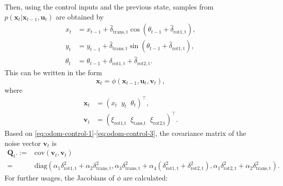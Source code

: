 Then, using the control inputs and the previous state, samples from $p(\mathbf{x}_t | \mathbf{x}_{t-1},\mathbf{u}_t)$
are obtained by
\begin{align}
    x_t      & = x_{t-1} + \hat{\delta}_{\mathrm{trans,t}}\cos(\theta_{t-1} + \hat{\delta}_{\mathrm{rot1,t}}), \label{eq:prop-x} \\
    y_t      & = y_{t-1} + \hat{\delta}_{\mathrm{trans,t}}\sin(\theta_{t-1} + \hat{\delta}_{\mathrm{rot1,t}}), \label{eq:prop-y} \\
    \theta_t & = \theta_{t-1} + \hat{\delta}_{\mathrm{rot1,t}} + \hat{\delta}_{\mathrm{rot2,t}}. \label{eq:prop-theta}
\end{align}
This can be written in the form
\begin{equation}
    \mathbf{x}_t = \phi(\mathbf{x}_{t-1},\mathbf{u}_t,\mathbf{v}_t),
\end{equation}
where
\begin{align}
    \mathbf{x}_t & = (x_t\;\;y_t\;\;\theta_t)^{\top},                                            \\
    \mathbf{v}_t & = (\xi_{\text{rot1,t}}\;\;\xi_{\text{tans,t}}\;\;\xi_{\text{rot2,t}})^{\top}.
\end{align}
Based on \eqref{eq:odom-control-1}-\eqref{eq:odom-control-3}, the covariance matrix of the noise
vector $\mathbf{v}_t$ is
\begin{align}\label{eq:control-covar}
    \mathbf{Q}_t. := & \text{cov}(\mathbf{v}_t,\mathbf{v}_t) \nonumber \\
    =                &
    \text{diag}(\alpha_1\delta_{\mathrm{rot1,t}}^2+\alpha_2\delta_{\mathrm{trans,t}}^2,
    \alpha_3\delta_{\mathrm{trans,t}}^2+\alpha_4(\delta_{\mathrm{rot1,t}}^2+\delta_{\mathrm{rot2,t}}^2),
    \alpha_1\delta_{\mathrm{rot2,t}}^2+\alpha_2\delta_{\mathrm{trans,t}}^2).
\end{align}
For further usages, the Jacobians of $\phi$ are calculated:

